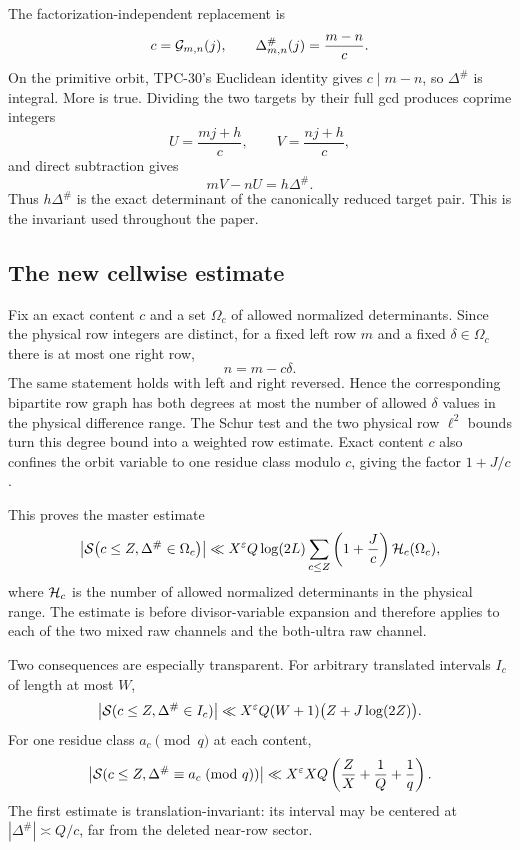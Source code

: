 The factorization-independent replacement is
\begin{equation}
 c=\mathcal G_{m,n}(j),\qquad
 \Delta^\#_{m,n}(j)=\frac{m-n}{c}.
 \label{eq:tpc31-intro-canonical-pair}
\end{equation}
On the primitive orbit, TPC-30's Euclidean identity gives
$c\mid m-n$, so $\Delta^\#$ is integral.  More is true.  Dividing the
two targets by their full gcd produces coprime integers
\[
 U=\frac{mj+h}{c},\qquad V=\frac{nj+h}{c},
\]
and direct subtraction gives
\begin{equation}
 \boxed{mV-nU=h\Delta^\#.}
 \label{eq:tpc31-intro-reduced-determinant}
\end{equation}
Thus $h\Delta^\#$ is the exact determinant of the canonically reduced
target pair.  This is the invariant used throughout the paper.

\subsection{The new cellwise estimate}

Fix an exact content $c$ and a set $\Omega_c$ of allowed normalized
determinants.  Since the physical row integers are distinct, for a
fixed left row $m$ and a fixed $\delta\in\Omega_c$ there is at most
one right row,
\[
 n=m-c\delta.
\]
The same statement holds with left and right reversed.  Hence the
corresponding bipartite row graph has both degrees at most the number
of allowed $\delta$ values in the physical difference range.  The
Schur test and the two physical row $\ell^2$ bounds turn this degree
bound into a weighted row estimate.  Exact content $c$ also confines
the orbit variable to one residue class modulo $c$, giving the factor
$1+J/c$.

This proves the master estimate
\begin{equation}
 \left|\mathcal S\bigl(c\le Z,\Delta^\#\in\Omega_c\bigr)\right|
 \ll X^\varepsilon Q\log(2L)
 \sum_{c\le Z}\left(1+\frac Jc\right)
 \mathcal H_c(\Omega_c),
 \label{eq:tpc31-intro-master}
\end{equation}
where $\mathcal H_c$ is the number of allowed normalized determinants in the
physical range.  The estimate is before divisor-variable expansion
and therefore applies to each of the two mixed raw channels and the
both-ultra raw channel.

Two consequences are especially transparent.  For arbitrary
translated intervals $I_c$ of length at most $W$,
\begin{equation}
 \left|\mathcal S(c\le Z,\Delta^\#\in I_c)\right|
 \ll X^\varepsilon Q(W+1)\bigl(Z+J\log(2Z)\bigr).
 \label{eq:tpc31-intro-window}
\end{equation}
For one residue class $a_c\pmod q$ at each content,
\begin{equation}
 \left|\mathcal S(c\le Z,\Delta^\#\equiv a_c\!\pmod q)\right|
 \ll X^\varepsilon XQ
 \left(\frac ZX+\frac1Q+\frac1q\right).
 \label{eq:tpc31-intro-residue}
\end{equation}
The first estimate is translation-invariant: its interval may be
centered at $|\Delta^\#|\asymp Q/c$, far from the deleted near-row
sector.

